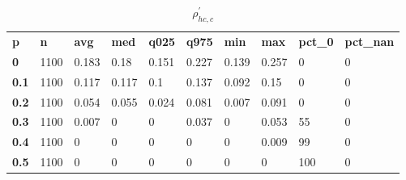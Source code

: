 \begin{table}[h]
 \centering 
\footnotesize
\caption{$\rho_{hc,c}^\prime $}
\label{tab:alphahcc}
\begin{tabular}[h]{| l l l l l l l l l l|
    } \hline
\textbf{ p} & \textbf{ n} & \textbf{ avg} & \textbf{ med} & \textbf{ q025} & \textbf{ q975} & \textbf{ min} & \textbf{ max} & \textbf{ pct\_0} & \textbf{ pct\_nan}
           \\
  \textbf{  0} & 1100 & 0.183 &  0.18 & 0.151 & 0.227 & 0.139 & 0.257 &   0 & 0
           \\
  \textbf{0.1} & 1100 & 0.117 & 0.117 &   0.1 & 0.137 & 0.092 &  0.15 &   0 & 0
           \\
  \textbf{0.2} & 1100 & 0.054 & 0.055 & 0.024 & 0.081 & 0.007 & 0.091 &   0 & 0
           \\
  \textbf{0.3} & 1100 & 0.007 &     0 &     0 & 0.037 &     0 & 0.053 &  55 & 0
           \\
  \textbf{0.4} & 1100 &     0 &     0 &     0 &     0 &     0 & 0.009 &  99 & 0
           \\
  \textbf{0.5} & 1100 &     0 &     0 &     0 &     0 &     0 &     0 & 100 & 0
           \\
 \hline \end{tabular}
 \end{table}
